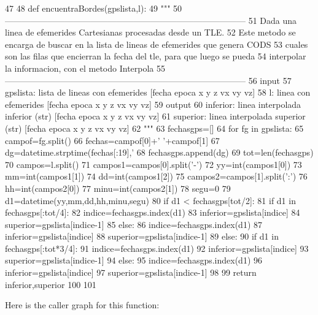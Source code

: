 \begin{DoxyCode}
47 
48 def encuentraBordes(gpslista,l):
49     """
50    
       ------------------------------------------------------------------------------------
51     Dada una linea de efemerides Cartesianas procesadas desde un TLE. 
52     Este metodo se encarga de buscar en la lista de lineas de efemerides que
       genera CODS
53     cuales son las filas que encierran  la fecha del tle, para que luego se
       pueda
54     interpolar la informacion, con el metodo Interpola
55    
       ------------------------------------------------------------------------------------
56     input
57         gpslista: lista de lineas con efemerides [fecha epoca x y z vx vy vz]
58         l: linea con efemerides [fecha epoca x y z vx vy vz]
59     output
60         inferior: linea interpolada inferior (str) [fecha epoca x y z vx vy vz]
61         superior: linea interpolada superior (str) [fecha epoca x y z vx vy vz]
62     """
63     fechasgps=[]
64     for fg in gpslista:
65         campof=fg.split()
66         fechas=campof[0]+' '+campof[1]
67         dg=datetime.strptime(fechas[:19],'%
68         fechasgps.append(dg)
69     tot=len(fechasgps)
70     campos=l.split()
71     campos1=campos[0].split('-')
72     yy=int(campos1[0])
73     mm=int(campos1[1])
74     dd=int(campos1[2])
75     campos2=campos[1].split(':')
76     hh=int(campos2[0])
77     minu=int(campos2[1])
78     segu=0
79     d1=datetime(yy,mm,dd,hh,minu,segu)      
80     if d1 < fechasgps[tot/2]:
81         if d1 in fechasgps[:tot/4]:
82             indice=fechasgps.index(d1)
83             inferior=gpslista[indice]
84             superior=gpslista[indice-1]
85         else:
86             indice=fechasgps.index(d1)
87             inferior=gpslista[indice]
88             superior=gpslista[indice-1]
89     else:
90         if d1 in fechasgps[:tot*3/4]:
91             indice=fechasgps.index(d1)
92             inferior=gpslista[indice]
93             superior=gpslista[indice-1]
94         else:
95             indice=fechasgps.index(d1)
96             inferior=gpslista[indice]
97             superior=gpslista[indice-1]
98                 
99     return inferior,superior
100              
101 

\end{DoxyCode}


\-Here is the caller graph for this function\-:


